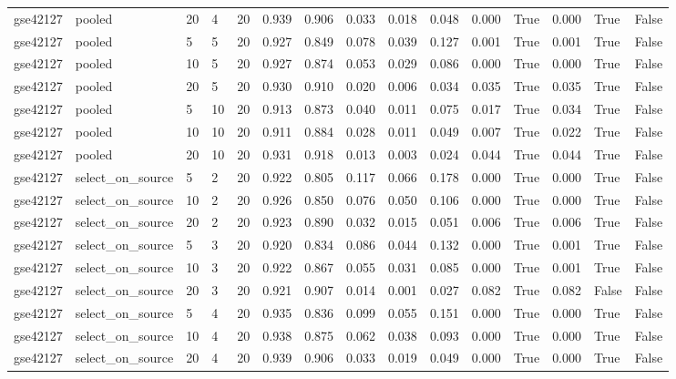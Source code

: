 \begin{table}[t]
\begin{tabular}{lllllllllllllll}
    gse42127 & pooled & 20 & 4 & 20 & 0.939 & 0.906 & 0.033 & 0.018 & 0.048 & 0.000 & True & 0.000 & True & False \\
    gse42127 & pooled & 5 & 5 & 20 & 0.927 & 0.849 & 0.078 & 0.039 & 0.127 & 0.001 & True & 0.001 & True & False \\
    gse42127 & pooled & 10 & 5 & 20 & 0.927 & 0.874 & 0.053 & 0.029 & 0.086 & 0.000 & True & 0.000 & True & False \\
    gse42127 & pooled & 20 & 5 & 20 & 0.930 & 0.910 & 0.020 & 0.006 & 0.034 & 0.035 & True & 0.035 & True & False \\
    gse42127 & pooled & 5 & 10 & 20 & 0.913 & 0.873 & 0.040 & 0.011 & 0.075 & 0.017 & True & 0.034 & True & False \\
    gse42127 & pooled & 10 & 10 & 20 & 0.911 & 0.884 & 0.028 & 0.011 & 0.049 & 0.007 & True & 0.022 & True & False \\
    gse42127 & pooled & 20 & 10 & 20 & 0.931 & 0.918 & 0.013 & 0.003 & 0.024 & 0.044 & True & 0.044 & True & False \\
    gse42127 & select\_on\_source & 5 & 2 & 20 & 0.922 & 0.805 & 0.117 & 0.066 & 0.178 & 0.000 & True & 0.000 & True & False \\
    gse42127 & select\_on\_source & 10 & 2 & 20 & 0.926 & 0.850 & 0.076 & 0.050 & 0.106 & 0.000 & True & 0.000 & True & False \\
    gse42127 & select\_on\_source & 20 & 2 & 20 & 0.923 & 0.890 & 0.032 & 0.015 & 0.051 & 0.006 & True & 0.006 & True & False \\
    gse42127 & select\_on\_source & 5 & 3 & 20 & 0.920 & 0.834 & 0.086 & 0.044 & 0.132 & 0.000 & True & 0.001 & True & False \\
    gse42127 & select\_on\_source & 10 & 3 & 20 & 0.922 & 0.867 & 0.055 & 0.031 & 0.085 & 0.000 & True & 0.001 & True & False \\
    gse42127 & select\_on\_source & 20 & 3 & 20 & 0.921 & 0.907 & 0.014 & 0.001 & 0.027 & 0.082 & True & 0.082 & False & False \\
    gse42127 & select\_on\_source & 5 & 4 & 20 & 0.935 & 0.836 & 0.099 & 0.055 & 0.151 & 0.000 & True & 0.000 & True & False \\
    gse42127 & select\_on\_source & 10 & 4 & 20 & 0.938 & 0.875 & 0.062 & 0.038 & 0.093 & 0.000 & True & 0.000 & True & False \\
    gse42127 & select\_on\_source & 20 & 4 & 20 & 0.939 & 0.906 & 0.033 & 0.019 & 0.049 & 0.000 & True & 0.000 & True & False \\

\end{tabular}
\end{table}

